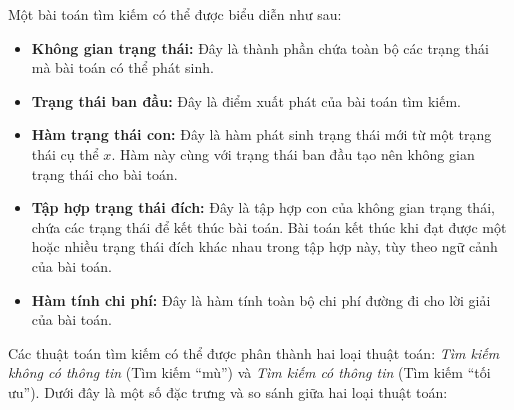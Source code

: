 Một bài toán tìm kiếm có thể được biểu diễn như sau: \cite{AI_HCMUS}
\begin{itemize}[labelindent=2em, labelsep=0.3cm, leftmargin=1cm, wide=\parindent, topsep=0.1cm, itemsep=-1ex, partopsep=1.5ex, parsep=1.5ex]
	\item \textbf{Không gian trạng thái:} Đây là thành phần chứa toàn bộ các trạng thái mà bài toán có thể phát sinh.
	\item \textbf{Trạng thái ban đầu:} Đây là điểm xuất phát của bài toán tìm kiếm.
	\item \textbf{Hàm trạng thái con:} Đây là hàm phát sinh trạng thái mới từ một trạng thái cụ thể $x$. Hàm này cùng với trạng thái ban đầu tạo nên không gian trạng thái cho bài toán.
	\item \textbf{Tập hợp trạng thái đích:} Đây là tập hợp con của không gian trạng thái, chứa các trạng thái để kết thúc bài toán. Bài toán kết thúc khi đạt được một hoặc nhiều trạng thái đích khác nhau trong tập hợp này, tùy theo ngữ cảnh của bài toán.
	\item \textbf{Hàm tính chi phí:} Đây là hàm tính toàn bộ chi phí đường đi cho lời giải của bài toán.
\end{itemize}

Các thuật toán tìm kiếm có thể được phân thành hai loại thuật toán: \emph{Tìm kiếm không có thông tin} (Tìm kiếm ``mù'') và \emph{Tìm kiếm có thông tin} (Tìm kiếm ``tối ưu''). Dưới đây là một số đặc trưng và so sánh giữa hai loại thuật toán:

